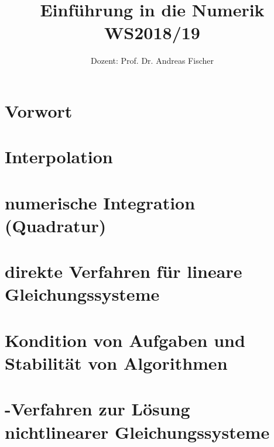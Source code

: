 \documentclass[ngerman,a4paper,order=firstname]{../../texmf/tex/latex/mathscript/mathscript}
\title{\textbf{Einführung in die Numerik WS2018/19}}
\author{Dozent: Prof. Dr. Andreas Fischer}
\begin{document}
\pagestyle{plain}

\maketitle

\hypertarget{tocpage}{}
\tableofcontents
{}

\pagebreak
{}
\pagestyle{fancy}

\chapter*{Vorwort}


\chapter{Interpolation}




\chapter{numerische Integration (Quadratur)}






\chapter{direkte Verfahren für lineare Gleichungssysteme}





\chapter{Kondition von Aufgaben und Stabilität von Algorithmen}



\chapter{-Verfahren zur Lösung nichtlinearer Gleichungssysteme}


\end{document}
